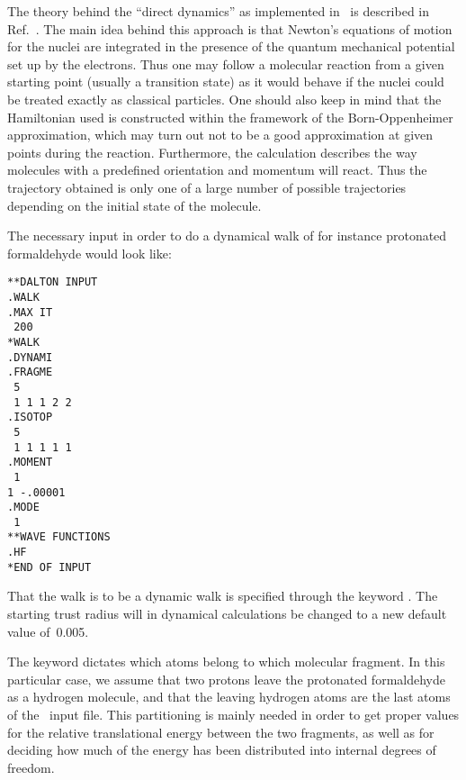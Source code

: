 \begin{center}
\end{center}

The theory behind the ``direct dynamics'' as implemented in \dalton\ is
described in Ref.~\cite{theuhjajcpl173}. The
main idea behind this
approach is that Newton's equations of motion for the nuclei are
integrated in the presence of the quantum mechanical potential set up
by the electrons. Thus one may follow a molecular reaction from a
given starting point (usually a transition state) as it would behave
if the nuclei could be treated exactly as classical particles. One
should also keep in mind that the Hamiltonian used is constructed within
the framework of the Born-Oppenheimer approximation, which may turn
out not to be a good approximation at given points during the
reaction. Furthermore, the calculation describes the way molecules
with a predefined orientation and momentum will react. Thus
the trajectory obtained is only one of a large number of
possible trajectories depending on the initial state of the molecule.

The necessary input in order to do a dynamical walk of for instance
protonated formaldehyde would look like:

\begin{verbatim}
**DALTON INPUT
.WALK
.MAX IT
 200
*WALK
.DYNAMI
.FRAGME
 5
 1 1 1 2 2
.ISOTOP
 5
 1 1 1 1 1
.MOMENT
 1
1 -.00001
.MODE
 1
**WAVE FUNCTIONS
.HF
*END OF INPUT
\end{verbatim}

That the walk is to
be a dynamic walk is specified through the keyword . The
starting trust radius will in dynamical calculations be changed to a
new default value of~0.005.

The keyword  dictates which atoms belong to which
molecular fragment. In this particular
case, we assume that two
protons leave the protonated formaldehyde as a
hydrogen molecule, and
that the leaving hydrogen atoms are the last atoms of the \mol\ input
file. This partitioning is mainly needed in order to get
proper values for the relative translational energy between the two
fragments, as well as for deciding how much of the energy has been
distributed into internal degrees of freedom.

